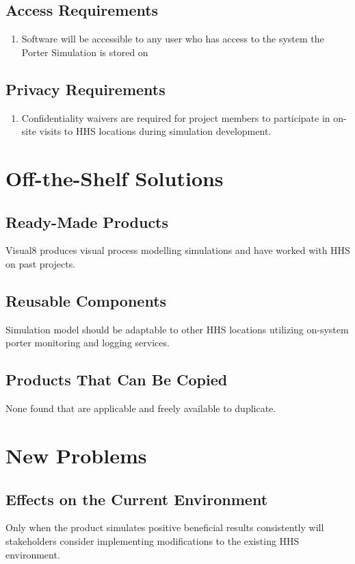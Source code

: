 \documentclass[paper=letter, fontsize=10pt]{scrartcl}
\numberwithin{equation}{section}		%
\numberwithin{figure}{section}			%
\numberwithin{table}{section}				%
\begin{document}
\subsection{Access Requirements}
	\begin{enumerate}
		\item Software will be accessible to any user who has access to the system the Porter Simulation is stored on
	\end{enumerate}
\subsection{Privacy Requirements}
	\begin{enumerate}
		\item Confidentiality waivers are required for project members to participate in on-site visits to HHS locations during simulation development.
	\end{enumerate}

\section{Off-the-Shelf Solutions}
\subsection{Ready-Made Products}
Visual8 produces visual process modelling simulations and have worked with HHS on past projects.
\subsection{Reusable Components}
Simulation model should be adaptable to other HHS locations utilizing on-system porter monitoring and logging services.
\subsection{Products That Can Be Copied}
None found that are applicable and freely available to duplicate.

\section{New Problems}
\subsection{Effects on the Current Environment}
Only when the product simulates positive beneficial results consistently will stakeholders consider implementing modifications to the existing HHS environment.
\end{document}
